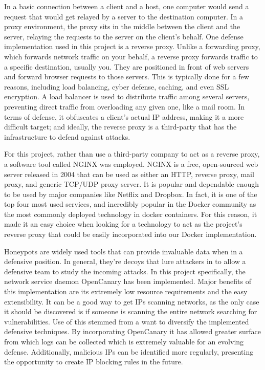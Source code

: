 	In a basic connection between a client and a host, one computer would send a request that would get relayed by a server to the destination computer. In a proxy environment, the proxy sits in the middle between the client and the server, relaying the requests to the server on the client's behalf. One defense implementation used in this project is a reverse proxy. Unlike a forwarding proxy, which forwards network traffic on your behalf, a reverse proxy forwards traffic to a specific destination, usually you. They are positioned in front of web servers and forward browser requests to those servers. This is typically done for a few reasons, including load balancing, cyber defense, caching, and even SSL encryption\cite{CloudFlare_2024j}. A load balancer is used to distribute traffic among several servers, preventing direct traffic from overloading any given one, like a mail room. In terms of defense, it obfuscates a client's actual IP address, making it a more difficult target; and ideally, the reverse proxy is a third-party that has the infrastructure to defend against attacks. 

	For this project, rather than use a third-party company to act as a reverse proxy, a software tool called NGINX was employed. NGINX is a free, open-sourced web server released in 2004 that can be used as either an HTTP, reverse proxy, mail proxy, and generic TCP/UDP proxy server. It is popular and dependable enough to be used by major companies like Netflix and Dropbox. In fact, it is one of the top four most used services, and incredibly popular in the Docker community as the most commonly deployed technology in docker containers\cite{wikiNginx_2024m}. For this reason, it made it an easy choice when looking for a technology to act as the project's reverse proxy that could be easily incorporated into our Docker implementation. 

	Honeypots are widely used tools that can provide invaluable data when in a defensive position. In general, they’re decoys that lure attackers in to allow a defensive team to study the incoming attacks. In this project specifically, the network service daemon OpenCanary has been implemented\cite{OpenCanary_2024j}. Major benefits of this implementation are its extremely low resource requirements and the easy extensibility. It can be a good way to get IPs scanning networks, as the only case it should be discovered is if someone is scanning the entire network searching for vulnerabilities. Use of this stemmed from a want to diversify the implemented defensive techniques. By incorporating OpenCanary it has allowed greater surface from which logs can be collected which is extremely valuable for an evolving defense. Additionally, malicious IPs can be identified more regularly, presenting the opportunity to create IP blocking rules in the future. 
